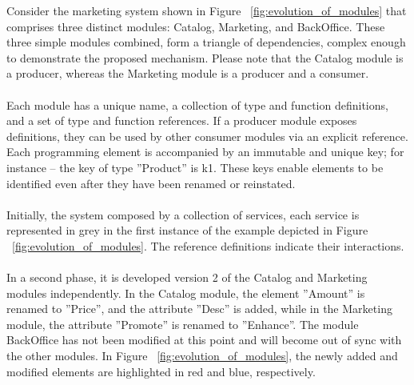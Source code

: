 Consider the marketing system shown in Figure ~\ref{fig:evolution_of_modules} that comprises three distinct modules: Catalog, Marketing, and BackOffice.
These three simple modules combined, form a triangle of dependencies, complex enough to demonstrate the proposed mechanism.
Please note that the Catalog module is a producer, whereas the Marketing module is a producer and a consumer.

\paragraph{}

Each module has a unique name, a collection of type and function definitions, and a set of type and function references.
If a producer module exposes definitions, they can be used by other consumer modules via an explicit reference.
Each programming element is accompanied by an immutable and unique key; for instance – the key of type ''Product'' is k1.
These keys enable elements to be identified even after they have been renamed or reinstated.

\paragraph{}

Initially, the system composed by a collection of services,
each service is represented in grey in the first instance of the example depicted in Figure ~\ref{fig:evolution_of_modules}.
The reference definitions indicate their interactions.

\paragraph{}

In a second phase, it is developed version 2 of the Catalog and Marketing modules independently.
In the Catalog module, the element ''Amount'' is renamed to ''Price'', and the attribute ''Desc'' is added, while in the Marketing module,
the attribute ''Promote'' is renamed to ''Enhance''.
The module BackOffice has not been modified at this point and will become out of sync with the other modules.
In Figure ~\ref{fig:evolution_of_modules}, the newly added and modified elements are highlighted in red and blue, respectively.

\paragraph{}

